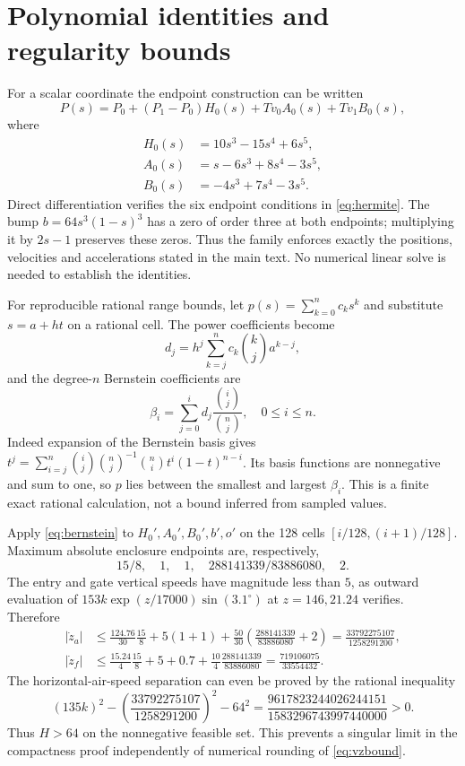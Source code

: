 \section{Polynomial identities and regularity bounds}\label{app:polynomials}
For a scalar coordinate the endpoint construction can be written
\begin{equation}\label{eq:basispoly}
 P(s)=P_0+(P_1-P_0)H_0(s)+Tv_0A_0(s)+Tv_1B_0(s),
\end{equation}
where
\begin{align*}
 H_0(s)&=10s^3-15s^4+6s^5,\\
 A_0(s)&=s-6s^3+8s^4-3s^5,\\
 B_0(s)&=-4s^3+7s^4-3s^5.
\end{align*}
Direct differentiation verifies the six endpoint conditions in \eqref{eq:hermite}. The bump $b=64s^3(1-s)^3$ has a zero of order three at both endpoints; multiplying it by $2s-1$ preserves these zeros. Thus the family enforces exactly the positions, velocities and accelerations stated in the main text. No numerical linear solve is needed to establish the identities.

For reproducible rational range bounds, let $p(s)=\sum_{k=0}^nc_ks^k$ and substitute $s=a+ht$ on a rational cell. The power coefficients become
\[
 d_j=h^j\sum_{k=j}^nc_k\binom kj a^{k-j},
\]
and the degree-$n$ Bernstein coefficients are
\begin{equation}\label{eq:bernstein}
 \beta_i=\sum_{j=0}^i d_j\frac{\binom ij}{\binom nj},\quad 0\leq i\leq n.
\end{equation}
Indeed expansion of the Bernstein basis gives
$t^j=\sum_{i=j}^n\binom ij\binom nj^{-1}\binom ni t^i(1-t)^{n-i}$. Its basis functions are nonnegative and sum to one, so $p$ lies between the smallest and largest $\beta_i$. This is a finite exact rational calculation, not a bound inferred from sampled values.

Apply \eqref{eq:bernstein} to $H_0',A_0',B_0',b',o'$ on the 128 cells $[i/128,(i+1)/128]$. Maximum absolute enclosure endpoints are, respectively,
\[
 15/8,\quad1,\quad1,\quad288141339/83886080,\quad2.
\]
The entry and gate vertical speeds have magnitude less than $5$, as outward evaluation of $153k\exp(z/17000)\sin(3.1^\circ)$ at $z=146,21.24$ verifies. Therefore
\begin{align*}
 |\dot z_a|&\leq\frac{124.76}{30}\frac{15}{8}+5(1+1)
 +\frac{50}{30}\left(\frac{288141339}{83886080}+2\right)
 =\frac{33792275107}{1258291200},\\
 |\dot z_f|&\leq\frac{15.24}{4}\frac{15}{8}+5+0.7
 +\frac{10}{4}\frac{288141339}{83886080}
 =\frac{719106075}{33554432}.
\end{align*}
The horizontal-air-speed separation can even be proved by the rational inequality
\[
 (135k)^2-\left(\frac{33792275107}{1258291200}\right)^2-64^2
 =\frac{9617823244026244151}{1583296743997440000}>0.
\]
Thus $H>64$ on the nonnegative feasible set. This prevents a singular limit in the compactness proof independently of numerical rounding of \eqref{eq:vzbound}.

